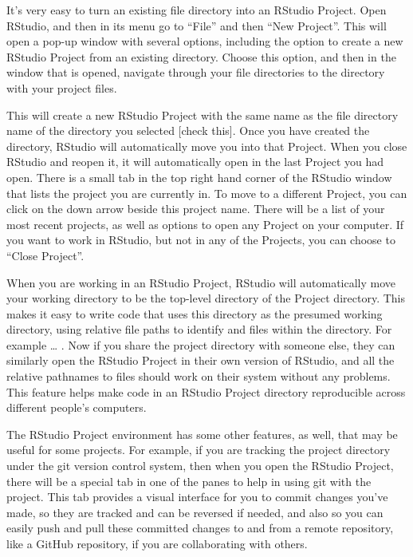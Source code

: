 \documentclass[]{tufte-book}
\begin{document}
It's very easy to turn an existing file directory into an RStudio Project.
Open RStudio, and then in its menu go to ``File'' and then ``New Project''.
This will open a pop-up window with several options, including the option to
create a new RStudio Project from an existing directory. Choose this option,
and then in the window that is opened, navigate through your file directories
to the directory with your project files.

This will create a new RStudio Project with the same name as the file directory
name of the directory you selected {[}check this{]}. Once you have created the
directory, RStudio will automatically move you into that Project. When you
close RStudio and reopen it, it will automatically open in the last Project
you had open. There is a small tab in the top right hand corner of the RStudio
window that lists the project you are currently in. To move to a different Project,
you can click on the down arrow beside this project name. There will be a list
of your most recent projects, as well as options to open any Project on your
computer. If you want to work in RStudio, but not in any of the Projects, you can
choose to ``Close Project''.

When you are working in an RStudio Project, RStudio will automatically move your
working directory to be the top-level directory of the Project directory. This
makes it easy to write code that uses this directory as the presumed working
directory, using relative file paths to identify and files within the directory.
For example \ldots{} . Now if you share the project directory with someone else, they
can similarly open the RStudio Project in their own version of RStudio, and all
the relative pathnames to files should work on their system without any problems.
This feature helps make code in an RStudio Project directory reproducible across
different people's computers.

The RStudio Project environment has some other features, as well, that may be
useful for some projects. For example, if you are tracking the project directory
under the git version control system, then when you open the RStudio Project,
there will be a special tab in one of the panes to help in using git with the
project. This tab provides a visual interface for you to commit changes you've made,
so they are tracked and can be reversed if needed, and also so you can easily
push and pull these committed changes to and from a remote repository, like a
GitHub repository, if you are collaborating with others.
\end{document}
